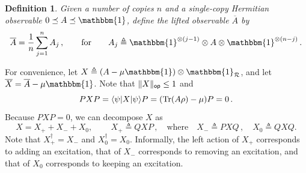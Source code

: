 \documentclass[10pt]{article}
\DeclarePairedDelimiter{\bra}{\langle}{\rvert}%
\DeclarePairedDelimiter{\ket}{\lvert}{\rangle}%
\DeclarePairedDelimiter\norm{\lVert}{\rVert}
\DeclareMathOperator{\Tr}{Tr}
\newcommand{\Id}{\mathbbm{1}}
\newtheorem{lemma}[theorem]{Lemma}
\newtheorem{definition}[theorem]{Definition}
\newcommand{\sitan}[1]{{\color{red}[sitan: #1]}}
\renewcommand{\sitan}[1]{}
\newcommand{\lift}[1]{\overline{#1}}
\begin{document}
\begin{definition}
    Given a number of copies $n$ and a single-copy Hermitian observable $0 \preceq A\preceq \Id$, define the \emph{lifted observable} $\lift{A}$ by
    \begin{equation}
        \lift{A} = \frac{1}{n}\sum^n_{j=1} A_j\,, \qquad \text{for} \qquad A_j \triangleq \Id^{\otimes (j-1)}\otimes A\otimes \Id^{\otimes (n-j)}\,.
    \end{equation}
\end{definition}



\noindent For convenience, let $X \triangleq (A - \mu \Id)\otimes \Id_{\mathcal{R}}$, and let $\lift{X} = \lift{A} - \mu \Id$. Note that $\norm{X}_{\sf op} \le 1$ and
\begin{equation}
    PXP = \bra{\psi}X\ket{\psi}P = (\Tr(A\rho) - \mu)P = 0\,.
\end{equation}
Because $PXP = 0$, we can decompose $X$ as
\begin{equation}
    X = X_+ + X_- + X_0,\, \qquad X_+ \triangleq QXP\,, \quad \text{where} \quad X_- \triangleq PXQ\,, \quad X_0 \triangleq QXQ.
\end{equation}
Note that $X^\dagger_+ = X_-$ and $X^\dagger_0 = X_0$.
Informally, the left action of $X_+$ corresponds to adding an excitation, that of $X_-$ corresponds to removing an excitation, and that of $X_0$ corresponds to keeping an excitation. 
\end{document}
